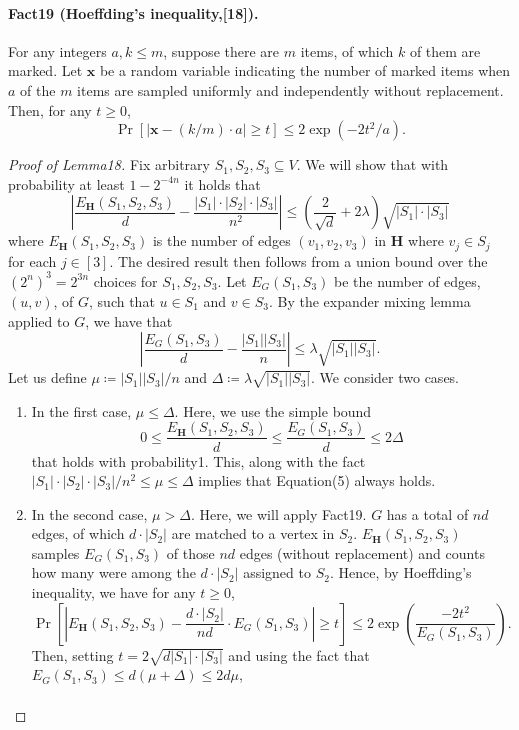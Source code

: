 \documentclass[10pt,a4paper]{article}
\begin{document}
\paragraph{Fact19 (Hoeffding's inequality,[18]).} For any integers $a,k\leq m$, suppose there are $m$ items, of which $k$ of them are marked. Let $\mathbf x$ be a random variable indicating the number of marked items when $a$ of the $m$ items are sampled uniformly and independently without replacement. Then, for any $t\geq0$,
\[\Pr[|\mathbf x-(k/m)\cdot a|\geq t]\leq2\exp(-2t^2/a).\]
\begin{proof}[Proof of Lemma18]
Fix arbitrary $S_1,S_2,S_3\subseteq V$. We will show that with probability at least $1-2^{-4n}$ it holds that
\[\left|\frac{E_{\mathbf H}(S_1,S_2,S_3)}d-\frac{|S_1|\cdot|S_2|\cdot|S_3|}{n^2}\right|\leq\left(\frac2{\sqrt d}+2\lambda\right)\sqrt{|S_1|\cdot|S_3|}\tag{5}\]
where $E_{\mathbf H}(S_1,S_2,S_3)$ is the number of edges $(v_1,v_2,v_3)$ in $\mathbf H$ where $v_j\in S_j$ for each $j\in[3]$. The desired result then follows from a union bound over the $(2^n)^3=2^{3n}$ choices for $S_1,S_2,S_3$.
Let $E_G(S_1,S_3)$ be the number of edges, $(u,v)$, of $G$, such that $u\in S_1$ and $v\in S_3$. By the expander mixing lemma applied to $G$, we have that
\[\left|\frac{E_G(S_1,S_3)}d-\frac{|S_1||S_3|}n\right|\leq\lambda\sqrt{|S_1||S_3|}.\]
Let us define $\mu\coloneqq|S_1||S_3|/n$ and $\Delta\coloneqq\lambda\sqrt{|S_1||S_3|}$. We consider two cases.
\begin{enumerate}
\item In the first case, $\mu\leq\Delta$. Here, we use the simple bound
\[0\leq\frac{E_{\mathbf H}(S_1,S_2,S_3)}d\leq\frac{E_G(S_1,S_3)}d\leq2\Delta\]
that holds with probability1. This, along with the fact $|S_1|\cdot|S_2|\cdot|S_3|/n^2\leq\mu\leq\Delta$ implies that Equation(5) always holds.
\item In the second case, $\mu>\Delta$. Here, we will apply Fact19. $G$ has a total of $nd$ edges, of which $d\cdot|S_2|$ are matched to a vertex in $S_2$. $E_{\mathbf H}(S_1,S_2,S_3)$ samples $E_G(S_1,S_3)$ of those $nd$ edges (without replacement) and counts how many were among the $d\cdot|S_2|$ assigned to $S_2$. Hence, by Hoeffding's inequality, we have for any $t\geq0$,
\[\Pr\left[\left|E_{\mathbf H}(S_1,S_2,S_3)-\frac{d\cdot|S_2|}{nd}\cdot E_G(S_1,S_3)\right|\geq t\right]\leq2\exp\left(\frac{-2t^2}{E_G(S_1,S_3)}\right).\]
Then, setting $t=2\sqrt{d|S_1|\cdot|S_3|}$ and using the fact that $E_G(S_1,S_3)\leq d(\mu+\Delta)\leq2d\mu$,
\begin{multline*}

\end{multline*}
\end{enumerate}
\end{proof}
\end{document}
